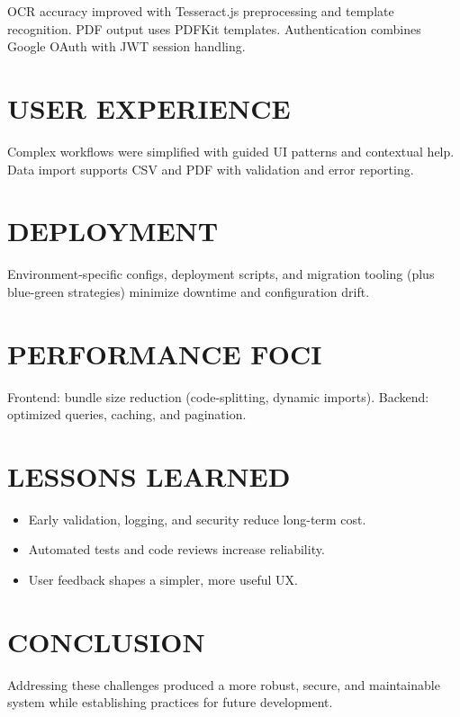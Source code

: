 OCR accuracy improved with Tesseract.js preprocessing and template recognition. PDF output uses PDFKit templates. Authentication combines Google OAuth with JWT session handling.

\section{USER EXPERIENCE}

Complex workflows were simplified with guided UI patterns and contextual help. Data import supports CSV and PDF with validation and error reporting.

\section{DEPLOYMENT}

Environment-specific configs, deployment scripts, and migration tooling (plus blue-green strategies) minimize downtime and configuration drift.

\section{PERFORMANCE FOCI}

Frontend: bundle size reduction (code-splitting, dynamic imports). Backend: optimized queries, caching, and pagination.

\section{LESSONS LEARNED}

\begin{itemize}
	\item Early validation, logging, and security reduce long-term cost.
	\item Automated tests and code reviews increase reliability.
	\item User feedback shapes a simpler, more useful UX.
\end{itemize}

\section{CONCLUSION}

Addressing these challenges produced a more robust, secure, and maintainable system while establishing practices for future development.